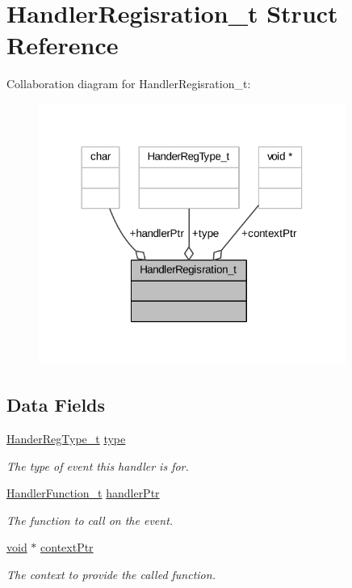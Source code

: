 \hypertarget{struct_handler_regisration__t}{}\section{Handler\+Regisration\+\_\+t Struct Reference}
\label{struct_handler_regisration__t}


Collaboration diagram for Handler\+Regisration\+\_\+t\+:
\nopagebreak
\begin{figure}[H]
\begin{center}
\leavevmode
\includegraphics[width=285pt]{struct_handler_regisration__t__coll__graph}
\end{center}
\end{figure}
\subsection*{Data Fields}
\begin{DoxyCompactItemize}
\item 
\hyperlink{inst_stat_8c_af1584967eed0c84187397da128cfbfbd}{Hander\+Reg\+Type\+\_\+t} \hyperlink{struct_handler_regisration__t_a15e1fea409a7f2eb64a899aaa42e8c52}{type}
\begin{DoxyCompactList}\small\item\em The type of event this handler is for. \end{DoxyCompactList}\item 
\hyperlink{inst_stat_8c_a1892928c6f6c0b1619b0f140ef1913f1}{Handler\+Function\+\_\+t} \hyperlink{struct_handler_regisration__t_af8a268db6cdae829281d774129f798c9}{handler\+Ptr}
\begin{DoxyCompactList}\small\item\em The function to call on the event. \end{DoxyCompactList}\item 
\hyperlink{_t_e_m_p_l_a_t_e__cdef_8h_ac9c84fa68bbad002983e35ce3663c686}{void} $\ast$ \hyperlink{struct_handler_regisration__t_af33299bec2c5d2c3333e961b12efc5c2}{context\+Ptr}
\begin{DoxyCompactList}\small\item\em The context to provide the called function. \end{DoxyCompactList}\end{DoxyCompactItemize}


